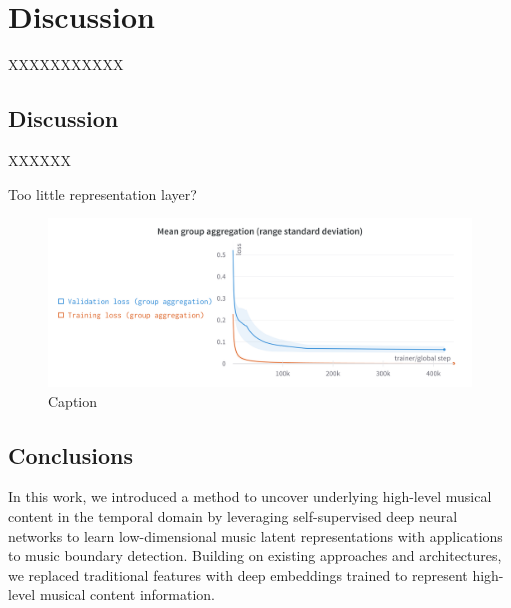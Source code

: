 \chapter{Discussion}

XXXXXXXXXXX

\section{Discussion}

XXXXXX

Too little representation layer?

\begin{figure}
    \centering
    \includegraphics[width=\textwidth]{figures/images/Mean group aggregation.png}
    \caption{Caption}
    \label{fig:enter-label}
\end{figure}

\section{Conclusions}

In this work, we introduced a method to uncover underlying high-level musical
content in the temporal domain by leveraging self-supervised deep neural networks to learn low-dimensional music latent representations with applications to music boundary detection. Building on existing approaches and architectures, we replaced traditional features with deep embeddings trained to represent high-level musical content information.

\newpage


